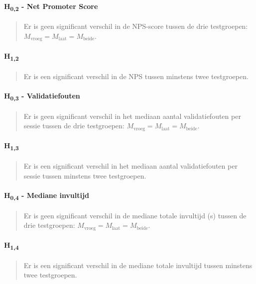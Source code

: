\paragraph{H\textsubscript{0,2} - Net Promoter Score}
\begin{quote}
  Er is geen significant verschil in de NPS-score tussen de drie testgroepen: $M_{\text{vroeg}} = M_{\text{laat}} = M_{\text{beide}}$.
\end{quote}
\paragraph{H\textsubscript{1,2}}
\begin{quote}
  Er is een significant verschil in de NPS tussen minstens twee testgroepen.
\end{quote}

\paragraph{H\textsubscript{0,3} - Validatiefouten}
\begin{quote}
  Er is geen significant verschil in het mediaan aantal validatiefouten per sessie tussen de drie testgroepen: $M_{\text{vroeg}} = M_{\text{laat}} = M_{\text{beide}}$.
\end{quote}
\paragraph{H\textsubscript{1,3}}
\begin{quote}
  Er is een significant verschil in het mediaan aantal validatiefouten per sessie tussen minstens twee testgroepen.
\end{quote}

\paragraph{H\textsubscript{0,4} - Mediane invultijd}
\begin{quote}
  Er is geen significant verschil in de mediane totale invultijd (s) tussen de drie testgroepen: $M_{\text{vroeg}} = M_{\text{laat}} = M_{\text{beide}}$.
\end{quote}
\paragraph{H\textsubscript{1,4}}
\begin{quote}
  Er is een significant verschil in de mediane totale invultijd tussen minstens twee testgroepen.
\end{quote}

